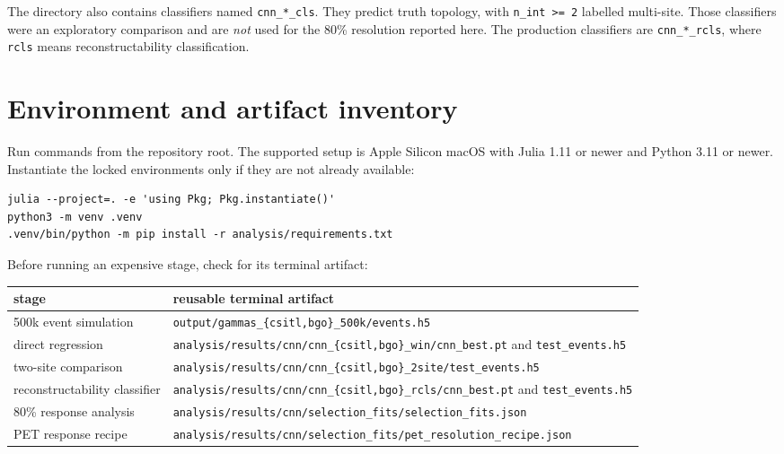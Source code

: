 \documentclass[11pt,a4paper]{article}
\newcommand{\code}[1]{\nolinkurl{#1}}
\begin{document}
The directory also contains classifiers named \code{cnn\_*\_cls}. They predict
truth topology, with \code{n\_int >= 2} labelled multi-site. Those classifiers
were an exploratory comparison and are \emph{not} used for the 80\% resolution
reported here. The production classifiers are \code{cnn\_*\_rcls}, where
\code{rcls} means reconstructability classification.

\section{Environment and artifact inventory}

Run commands from the repository root. The supported setup is Apple Silicon
macOS with Julia 1.11 or newer and Python 3.11 or newer. Instantiate the locked
environments only if they are not already available:

\begin{verbatim}
julia --project=. -e 'using Pkg; Pkg.instantiate()'
python3 -m venv .venv
.venv/bin/python -m pip install -r analysis/requirements.txt
\end{verbatim}

Before running an expensive stage, check for its terminal artifact:

\begin{center}
\begin{tabular}{p{}p{}}
\toprule
stage & reusable terminal artifact \\
\midrule
500k event simulation &
\code{output/gammas\_\{csitl,bgo\}\_500k/events.h5} \\
direct regression &
\code{analysis/results/cnn/cnn\_\{csitl,bgo\}\_win/cnn\_best.pt} and
\code{test\_events.h5} \\
two-site comparison &
\code{analysis/results/cnn/cnn\_\{csitl,bgo\}\_2site/test\_events.h5} \\
reconstructability classifier &
\code{analysis/results/cnn/cnn\_\{csitl,bgo\}\_rcls/cnn\_best.pt} and
\code{test\_events.h5} \\
80\% response analysis &
\code{analysis/results/cnn/selection\_fits/selection\_fits.json} \\
PET response recipe &
\code{analysis/results/cnn/selection\_fits/pet\_resolution\_recipe.json} \\
\bottomrule
\end{tabular}
\end{center}
\end{document}
